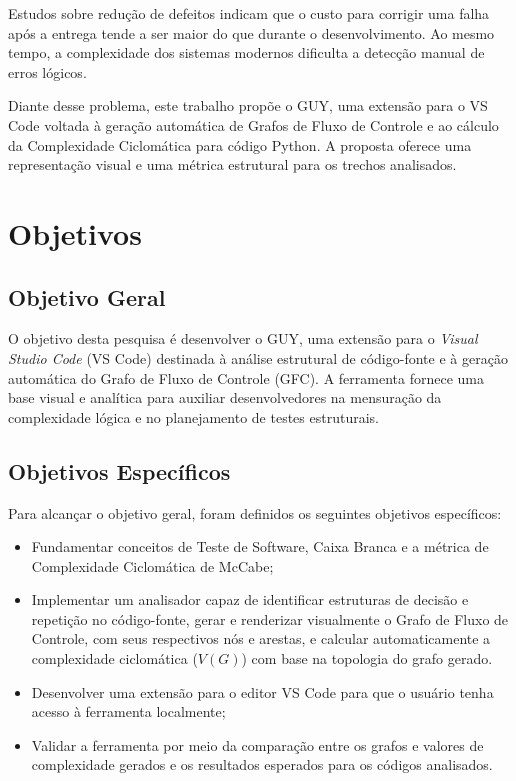 Estudos sobre redução de defeitos indicam que o custo para corrigir uma falha após a entrega tende a ser maior do que durante o desenvolvimento. Ao mesmo tempo, a complexidade dos sistemas modernos dificulta a detecção manual de erros lógicos.

Diante desse problema, este trabalho propõe o GUY, uma extensão para o VS Code voltada à geração automática de Grafos de Fluxo de Controle e ao cálculo da Complexidade Ciclomática para código Python. A proposta oferece uma representação visual e uma métrica estrutural para os trechos analisados.

\section{Objetivos}

\subsection{Objetivo Geral}
O objetivo desta pesquisa é desenvolver o GUY, uma extensão para o \textit{Visual Studio Code} (VS Code) destinada à análise estrutural de código-fonte e à geração automática do Grafo de Fluxo de Controle (GFC). A ferramenta fornece uma base visual e analítica para auxiliar desenvolvedores na mensuração da complexidade lógica e no planejamento de testes estruturais.

\subsection{Objetivos Específicos}
Para alcançar o objetivo geral, foram definidos os seguintes objetivos específicos:

\begin{itemize}
	\item Fundamentar conceitos de Teste de Software, Caixa Branca e a métrica de Complexidade Ciclomática de McCabe;
    \item Implementar um analisador capaz de identificar estruturas de decisão e repetição no código-fonte, gerar e renderizar visualmente o Grafo de Fluxo de Controle, com seus respectivos nós e arestas, e calcular automaticamente a complexidade ciclomática ($V(G)$) com base na topologia do grafo gerado.
	\item Desenvolver uma extensão para o editor VS Code para que o usuário tenha acesso à ferramenta localmente;
	\item Validar a ferramenta por meio da comparação entre os grafos e valores de complexidade gerados e os resultados esperados para os códigos analisados.
\end{itemize}
